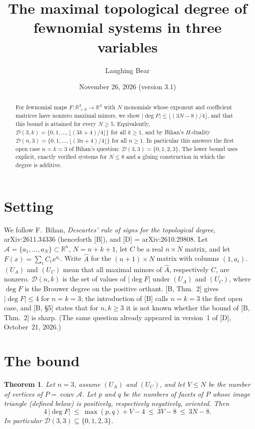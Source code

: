 \documentclass[11pt]{amsart}
\title{The maximal topological degree of fewnomial systems in three variables}
\author{Laughing Bear}
\date{November 26, 2026 (version 3.1)}
\newtheorem{theorem}{Theorem}
\theoremstyle{remark}
\newcommand{\A}{\mathcal A}
\begin{document}
\begin{abstract}
For fewnomial maps $F\colon\mathbb R^3_{>0}\to\mathbb R^3$ with $N$ monomials whose exponent and coefficient matrices have nonzero maximal minors, we show $|\deg F|\le\lfloor(3N-8)/4\rfloor$, and that this bound is attained for every $N\ge5$. Equivalently, $\mathcal D(3,k)=\{0,1,\dots,\lfloor(3k+4)/4\rfloor\}$ for all $k\ge1$, and by Bihan's $H$-duality $\mathcal D(n,3)=\{0,1,\dots,\lfloor(3n+4)/4\rfloor\}$ for all $n\ge1$. In particular this answers the first open case $n=k=3$ of Bihan's question: $\mathcal D(3,3)=\{0,1,2,3\}$. The lower bound uses explicit, exactly verified systems for $N\le8$ and a gluing construction in which the degree is additive.
\end{abstract}
\maketitle



\section{Setting}
We follow F.~Bihan, \emph{Descartes' rule of signs for the topological degree}, arXiv:2611.34336 (henceforth [B]), and [D] = arXiv:2610.29808.
Let $\A=\{a_1,\dots,a_N\}\subset\mathbb R^n$, $N=n+k+1$, let $C$ be a real $n\times N$ matrix, and let $F(x)=\sum_i C_i x^{a_i}$.
Write $\widehat A$ for the $(n+1)\times N$ matrix with columns $(1,a_i)$.
$(U_A)$ and $(U_C)$ mean that all maximal minors of $\widehat A$, respectively $C$, are nonzero.
$\mathcal D(n,k)$ is the set of values of $|\deg F|$ under $(U_A)$ and $(U_C)$, where $\deg F$ is the Brouwer degree on the positive orthant.
[B, Thm.~2] gives $|\deg F|\le 4$ for $n=k=3$; the introduction of [B] calls $n=k=3$ the first open case, and [B, \S5] states that for $n,k\ge3$ it is not known whether the bound of [B, Thm.~2] is sharp. (The same question already appeared in version~1 of [D], October~21, 2026.)

\section{The bound}
\begin{theorem}\label{thm:main}
Let $n=3$, assume $(U_A)$ and $(U_C)$, and let $V\le N$ be the number of vertices of $P=\operatorname{conv}\A$. Let $p$ and $q$ be the numbers of facets of $P$ whose image triangle (defined below) is positively, respectively negatively, oriented. Then
\[
4\,|\deg F|\ \le\ \max(p,q)+V-4\ \le\ 3V-8\ \le\ 3N-8 .
\]
In particular $\mathcal D(3,3)\subseteq\{0,1,2,3\}$.
\end{theorem}
\end{document}
